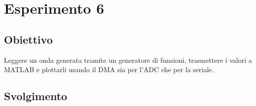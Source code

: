 \chapter*{Esperimento 6}

\section*{Obiettivo}
Leggere un onda generata tramite un generatore di funzioni, trasmettere i valori a MATLAB e plottarli usando il DMA sia per l'ADC che per la seriale.

\section*{Svolgimento}

